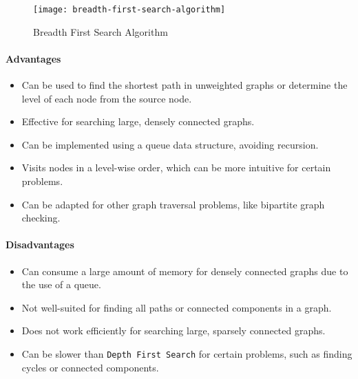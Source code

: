 \begin{figure}[!htbp]
    \centering
    \texttt{[image: breadth-first-search-algorithm]}
    \caption{Breadth First Search Algorithm \cite{zaltsman_dfs_bfs}}
    \label{fig:breadth-first-search-algorithm}
\end{figure}

\paragraph{Advantages}
\begin{itemize}
    \item Can be used to find the shortest path in unweighted graphs or determine the level of each node from the source node.
    \item Effective for searching large, densely connected graphs.
    \item Can be implemented using a queue data structure, avoiding recursion.
    \item Visits nodes in a level-wise order, which can be more intuitive for certain problems.
    \item Can be adapted for other graph traversal problems, like bipartite graph checking.
\end{itemize}
\paragraph{Disadvantages}
\begin{itemize}
    \item Can consume a large amount of memory for densely connected graphs due to the use of a queue.
    \item Not well-suited for finding all paths or connected components in a graph.
    \item Does not work efficiently for searching large, sparsely connected graphs.
    \item Can be slower than \lstinline{Depth First Search} for certain problems, such as finding cycles or connected components.
\end{itemize}





